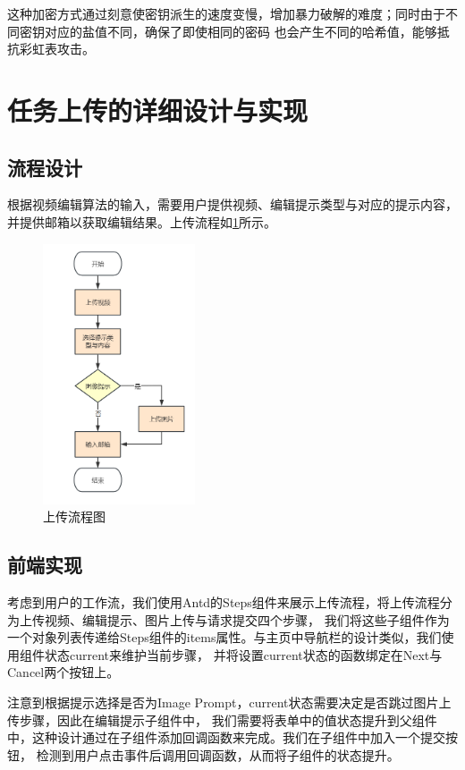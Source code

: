 这种加密方式通过刻意使密钥派生的速度变慢，增加暴力破解的难度；同时由于不同密钥对应的盐值不同，确保了即使相同的密码
也会产生不同的哈希值，能够抵抗彩虹表\cite{oechslin2003}攻击。

\section{任务上传的详细设计与实现}

\subsection{流程设计}

根据视频编辑算法的输入，需要用户提供视频、编辑提示类型与对应的提示内容，并提供邮箱以获取编辑结果。上传流程如\ref{fig:upload-process}所示。
\begin{figure}[ht]
    \centering
    \includegraphics[width=0.4\textwidth]{source/img/edit_process.png}
    \caption{上传流程图}
    \label{fig:upload-process}
\end{figure}

\subsection{前端实现}

考虑到用户的工作流，我们使用Antd的Steps组件来展示上传流程，将上传流程分为上传视频、编辑提示、图片上传与请求提交四个步骤，
我们将这些子组件作为一个对象列表传递给Steps组件的items属性。与主页中导航栏的设计类似，我们使用组件状态current来维护当前步骤，
并将设置current状态的函数绑定在Next与Cancel两个按钮上。

注意到根据提示选择是否为Image Prompt，current状态需要决定是否跳过图片上传步骤，因此在编辑提示子组件中，
我们需要将表单中的值状态提升到父组件中，这种设计通过在子组件添加回调函数来完成。我们在子组件中加入一个提交按钮，
检测到用户点击事件后调用回调函数，从而将子组件的状态提升。

